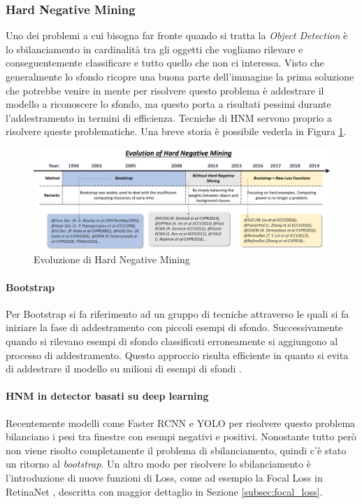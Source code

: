 \subsubsection{Hard Negative Mining}
Uno dei problemi a cui bisogna far fronte quando si tratta la \textit{Object Detection} è lo sbilanciamento in cardinalità tra gli oggetti che vogliamo rilevare e conseguentemente classificare e tutto quello che non ci interessa. Visto che generalmente lo sfondo ricopre una buona parte dell'immagine la prima soluzione che potrebbe venire in mente per risolvere questo problema è addestrare il modello a riconoscere lo sfondo, ma questo porta a risultati pessimi durante l'addestramento in termini di efficienza. Tecniche di \ac{HNM} servono proprio a risolvere queste problematiche. Una breve storia è possibile vederla in Figura \ref{fig:HNM_history}.
\begin{figure}
    \centering
    \includegraphics[width=\textwidth]{images/evol-hardnegmining.png}
    \caption{Evoluzione di Hard Negative Mining \cite{DBLP:journals/corr/abs-1905-05055}}
    \label{fig:HNM_history}
\end{figure}
\paragraph{Bootstrap}
Per Bootstrap si fa riferimento ad un gruppo di tecniche attraverso le quali si fa iniziare la fase di addestramento con piccoli esempi di sfondo. 
Successivamente quando si rilevano esempi di sfondo classificati erroneamente si aggiungono al processo di addestramento. Questo approccio risulta efficiente in quanto si evita di addestrare il modello su milioni di esempi di sfondi \cite{viola2001rapid, papageorgiou1998general, rowley1996human}.
\paragraph{HNM in detector basati su deep learning}
Recentemente modelli come Faster RCNN e \ac{YOLO} per risolvere questo problema bilanciano i pesi tra finestre con esempi negativi e positivi. Nonostante tutto però non viene risolto completamente il problema di sbilanciamento, quindi c'è stato un ritorno al \textit{bootstrap}. Un altro modo per risolvere lo sbilanciamento è l'introduzione di nuove funzioni di Loss, come ad esempio la Focal Loss in RetinaNet \cite{lin2017focal}, descritta con maggior dettaglio in Sezione \ref{subsec:focal_loss}. 




